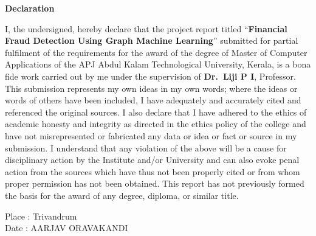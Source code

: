 \begin{center}
\vspace*{-0.55cm}
{\large\bfseries Declaration\par}
\end{center}
\vspace{14pt}

I, the undersigned, hereby declare that the project report titled ``\textbf{Financial Fraud Detection Using Graph Machine Learning}'' submitted for partial fulfilment of the requirements for the award of the degree of Master of Computer Applications of the APJ Abdul Kalam Technological University, Kerala, is a bona fide work carried out by me under the supervision of \textbf{Dr.\ Liji P I}, Professor. This submission represents my own ideas in my own words; where the ideas or words of others have been included, I have adequately and accurately cited and referenced the original sources. I also declare that I have adhered to the ethics of academic honesty and integrity as directed in the ethics policy of the college and have not misrepresented or fabricated any data or idea or fact or source in my submission. I understand that any violation of the above will be a cause for disciplinary action by the Institute and/or University and can also evoke penal action from the sources which have thus not been properly cited or from whom proper permission has not been obtained. This report has not previously formed the basis for the award of any degree, diploma, or similar title.

\vspace{36pt}
\noindent Place : Trivandrum\\
Date : \hfill AARJAV ORAVAKANDI
\clearpage
